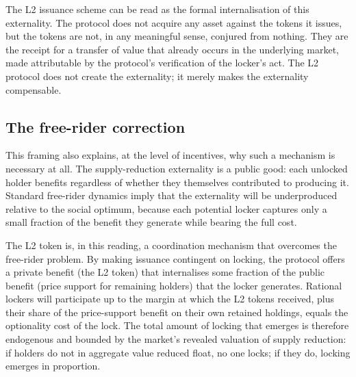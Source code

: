 \documentclass[11pt,a4paper]{article}
\begin{document}
The L2 issuance scheme can be read as the formal internalisation of this externality. The protocol does not acquire any asset against the tokens it issues, but the tokens are not, in any meaningful sense, conjured from nothing. They are the receipt for a transfer of value that already occurs in the underlying market, made attributable by the protocol's verification of the locker's act. The L2 protocol does not create the externality; it merely makes the externality compensable.

\subsection{The free-rider correction}

This framing also explains, at the level of incentives, why such a mechanism is necessary at all. The supply-reduction externality is a public good: each unlocked holder benefits regardless of whether they themselves contributed to producing it. Standard free-rider dynamics imply that the externality will be underproduced relative to the social optimum, because each potential locker captures only a small fraction of the benefit they generate while bearing the full cost.

The L2 token is, in this reading, a coordination mechanism that overcomes the free-rider problem. By making issuance contingent on locking, the protocol offers a private benefit (the L2 token) that internalises some fraction of the public benefit (price support for remaining holders) that the locker generates. Rational lockers will participate up to the margin at which the L2 tokens received, plus their share of the price-support benefit on their own retained holdings, equals the optionality cost of the lock. The total amount of locking that emerges is therefore endogenous and bounded by the market's revealed valuation of supply reduction: if holders do not in aggregate value reduced float, no one locks; if they do, locking emerges in proportion.
\end{document}
